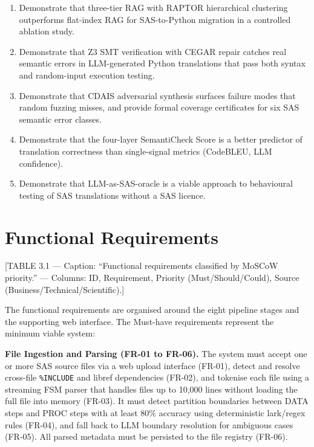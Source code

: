 \begin{enumerate}
  \item Demonstrate that three-tier RAG with RAPTOR hierarchical clustering
    outperforms flat-index RAG for SAS-to-Python migration in a controlled
    ablation study.
  \item Demonstrate that Z3 SMT verification with CEGAR repair catches real
    semantic errors in LLM-generated Python translations that pass both syntax
    and random-input execution testing.
  \item Demonstrate that CDAIS adversarial synthesis surfaces failure modes
    that random fuzzing misses, and provide formal coverage certificates for
    six SAS semantic error classes.
  \item Demonstrate that the four-layer SemantiCheck Score is a better
    predictor of translation correctness than single-signal metrics (CodeBLEU,
    LLM confidence).
  \item Demonstrate that LLM-as-SAS-oracle is a viable approach to behavioural
    testing of SAS translations without a SAS licence.
\end{enumerate}

\section{Functional Requirements}
\label{sec:functional-requirements}

[TABLE 3.1 --- Caption: ``Functional requirements classified by MoSCoW
priority.'' --- Columns: ID, Requirement, Priority (Must/Should/Could),
Source (Business/Technical/Scientific).]

The functional requirements are organised around the eight pipeline stages and
the supporting web interface. The Must-have requirements represent the minimum
viable system:

\textbf{File Ingestion and Parsing (FR-01 to FR-06).} The system must accept
one or more SAS source files via a web upload interface (FR-01), detect and
resolve cross-file \texttt{\%INCLUDE} and libref dependencies (FR-02), and
tokenise each file using a streaming FSM parser that handles files up to
10,000 lines without loading the full file into memory (FR-03). It must detect
partition boundaries between DATA steps and PROC steps with at least 80\%
accuracy using deterministic lark/regex rules (FR-04), and fall back to LLM
boundary resolution for ambiguous cases (FR-05). All parsed metadata must be
persisted to the file registry (FR-06).

